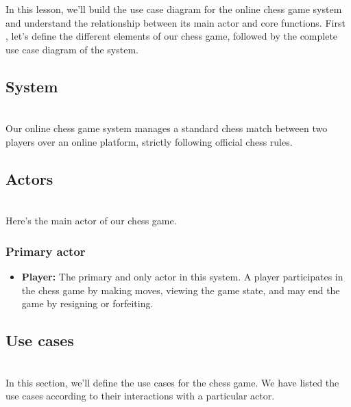 

In this lesson, we'll build the use case diagram for the online chess game system and understand the relationship between its main actor and core functions. First , let's define the different elements of our chess game, followed by the complete use case diagram of the system.

\subsection{System}\label{pDLe944bqBcjGByMuP9vV}
\\
Our online chess game system manages a standard chess match between two players over an online platform, strictly following official chess rules.

\subsection{Actors}\label{m_2XWlP52uAZ6vufTh8Uu}
\\
Here's the main actor of our chess game.

\subsubsection{Primary actor}\label{ne5_itpd61J8X9RfGw5Q3}

\begin{itemize}
\item
\protect{}\label{PrX6bMkMeGnfmmZsCpwoE}
\textbf{Player:} The primary and only actor in this system. A player participates in the chess game by making moves, viewing the game state, and may end the game by resigning or forfeiting.
\end{itemize}

\subsection{Use cases}\label{9uBvdJ_1YGNDVJzZTdcLu}
\\
In this section, we'll define the use cases for the chess game. We have listed the use cases according to their interactions with a particular actor.

